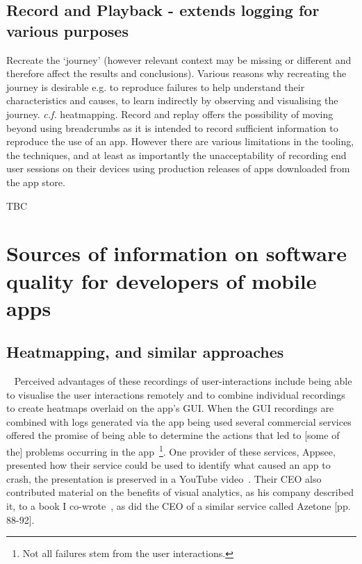 \subsection{Record and Playback - extends logging for various purposes}
Recreate the `journey' (however relevant context may be missing or different and therefore affect the results and conclusions). Various reasons why recreating the journey is desirable e.g. to reproduce failures to help understand their characteristics and causes, to learn indirectly by observing and visualising the journey. \emph{c.f.} heatmapping. Record and replay offers the possibility of moving beyond using breadcrumbs as it is intended to record sufficient information to reproduce the use of an app. However there are various limitations in the tooling, the techniques, and at least as importantly the unacceptability of recording end user sessions on their devices using production releases of apps downloaded from the app store. 

TBC


\section{Sources of information on software quality for developers of mobile apps}
\subsection{Heatmapping, and similar approaches}~\label{section-heatmapping} 
Perceived advantages of these recordings of user-interactions include being able to visualise the user interactions remotely and to combine individual recordings to create heatmaps overlaid on the app's GUI. When the GUI recordings are combined with logs generated via the app being used several commercial services offered the promise of being able to determine the actions that led to [some of the] problems occurring in the app~\footnote{Not all failures stem from the user interactions.}. One provider of these services, Appsee, presented how their service could be used to identify what caused an app to crash, the presentation is preserved in a YouTube video~. Their CEO also contributed material on the benefits of visual analytics, as his company described it, to a book I co-wrote~\cite[pp. 94-95]{harty_aymer_playbook_2016}, as did the CEO of a similar service called Azetone [pp. 88-92]. %

